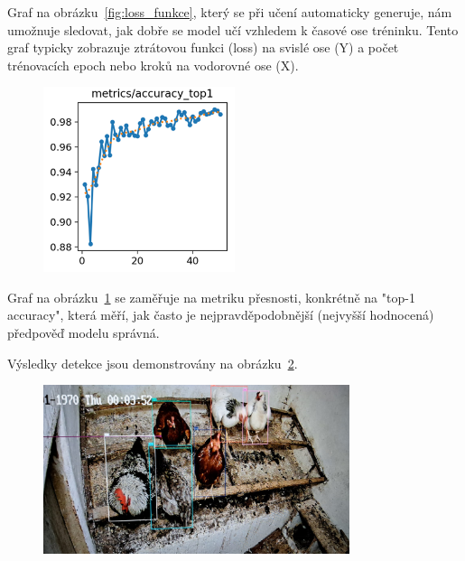 Graf na obrázku~\ref{fig:loss_funkce}, který se při učení automaticky generuje, nám umožnuje sledovat, jak dobře se model učí vzhledem k časové ose tréninku.
Tento graf typicky zobrazuje ztrátovou funkci (loss) na svislé ose (Y) a počet trénovacích epoch nebo kroků na vodorovné ose (X).

\begin{figure}[H]
    \centering
    \includegraphics[width=0.5\textwidth]{img/top1_accuracy}
    \label{fig:top1_accuracy}
\end{figure}

Graf na obrázku~\ref{fig:top1_accuracy} se zaměřuje na metriku přesnosti, konkrétně na
"top-1 accuracy", která měří, jak často je nejpravděpodobnější (nejvyšší hodnocená) předpověď modelu správná.

Výsledky detekce jsou demonstrovány na obrázku~\ref{fig:detekce_slepic}.

\begin{figure}[H]
    \centering
    \includegraphics[width=0.8\textwidth]{img/detekce_slepic}
    \label{fig:detekce_slepic}
\end{figure}
